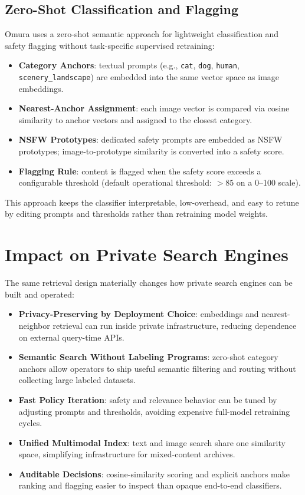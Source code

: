 \documentclass[11pt]{article}
\begin{document}
\subsection{Zero-Shot Classification and Flagging}
Omura uses a zero-shot semantic approach for lightweight classification and safety
flagging without task-specific supervised retraining:
\begin{itemize}[leftmargin=1.2em]
  \item \textbf{Category Anchors}: textual prompts (e.g., \texttt{cat}, \texttt{dog},
  \texttt{human}, \texttt{scenery\_landscape}) are embedded into the same vector
  space as image embeddings.
  \item \textbf{Nearest-Anchor Assignment}: each image vector is compared via cosine
  similarity to anchor vectors and assigned to the closest category.
  \item \textbf{NSFW Prototypes}: dedicated safety prompts are embedded as NSFW
  prototypes; image-to-prototype similarity is converted into a safety score.
  \item \textbf{Flagging Rule}: content is flagged when the safety score exceeds a
  configurable threshold (default operational threshold: \(>85\) on a 0--100 scale).
\end{itemize}

This approach keeps the classifier interpretable, low-overhead, and easy to retune
by editing prompts and thresholds rather than retraining model weights.

\section{Impact on Private Search Engines}
The same retrieval design materially changes how private search engines can be built
and operated:
\begin{itemize}[leftmargin=1.2em]
  \item \textbf{Privacy-Preserving by Deployment Choice}: embeddings and nearest-neighbor
  retrieval can run inside private infrastructure, reducing dependence on external
  query-time APIs.
  \item \textbf{Semantic Search Without Labeling Programs}: zero-shot category anchors
  allow operators to ship useful semantic filtering and routing without collecting
  large labeled datasets.
  \item \textbf{Fast Policy Iteration}: safety and relevance behavior can be tuned by
  adjusting prompts and thresholds, avoiding expensive full-model retraining cycles.
  \item \textbf{Unified Multimodal Index}: text and image search share one similarity
  space, simplifying infrastructure for mixed-content archives.
  \item \textbf{Auditable Decisions}: cosine-similarity scoring and explicit anchors make
  ranking and flagging easier to inspect than opaque end-to-end classifiers.
\end{itemize}
\end{document}

